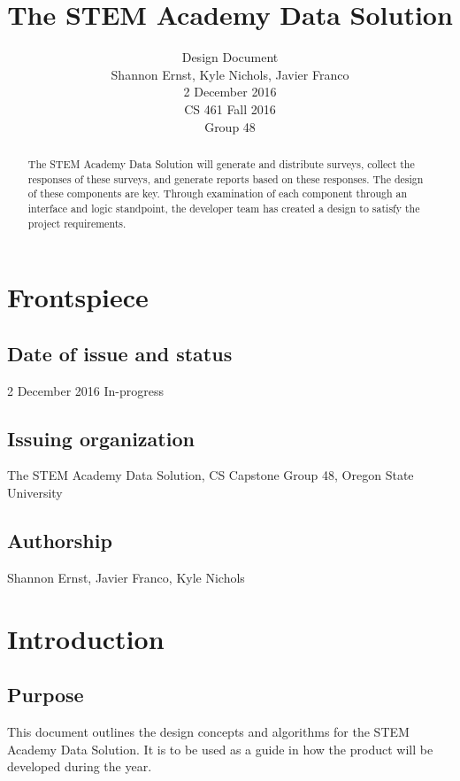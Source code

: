 \documentclass[letterpaper,10pt,serif, draftclsnofoot,onecolumn, compsoc, titlepage]{IEEEtran}
\title{The STEM Academy Data Solution}
\author{Design Document \\ Shannon Ernst, Kyle Nichols, Javier Franco\\ 2 December 2016\\ CS 461 Fall 2016\\ Group 48}
\begin{document}
\maketitle
\begin{abstract}
The STEM Academy Data Solution will generate and distribute surveys, collect the responses of these surveys, and generate reports based on these responses. The design of these components are key. Through examination of each component through an interface and logic standpoint, the developer team has created a design to satisfy the project requirements. 
\end{abstract}
\newpage

\section{Frontspiece}
\subsection{Date of issue and status}
2 December 2016 In-progress
\subsection{Issuing organization}
The STEM Academy Data Solution, CS Capstone Group 48, Oregon State University 
\subsection{Authorship}
Shannon Ernst, Javier Franco, Kyle Nichols

\section{Introduction}
\subsection{Purpose}
This document outlines the design concepts and algorithms for the STEM Academy Data Solution.
It is to be used as a guide in how the product will be developed during the year. 
\end{document}
